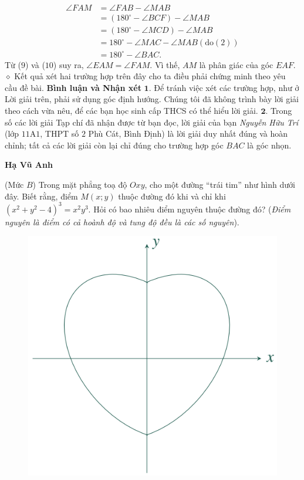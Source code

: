 \begin{multicols}{2}
\begin{align*}
		\angle FAM &= \angle FAB - \angle MAB\\
		&= \left( {{{180}^{\circ}} - \angle BCF} \right) - \angle MAB\\
		&= \left( {{{180}^{\circ}} - \angle MCD} \right) - \angle MAB\\
		&= {180^{\circ}} - \angle MAC - \angle MAB({\text{do}}(2))\\
		&= {180^{\circ}} - \angle BAC. \tag{$10$}
	\end{align*}
	Từ ($9$) và ($10$) suy ra, $\angle EAM = \angle FAM$.  Vì thế, $AM$ là phân giác của góc $EAF$.
	\vskip 0.05cm
	$\diamond$ Kết quả xét hai trường hợp trên đây cho ta điều phải chứng minh theo yêu cầu đề bài.
	\vskip 0.05cm
	\textbf{\color{thachthuctoanhoc}Bình luận và Nhận xét}
	\vskip 0.05cm
	$\pmb{1.}$ Để tránh việc xét các trường hợp, như ở Lời giải trên, phải sử dụng góc định hướng. Chúng tôi đã không trình bày lời giải theo cách vừa nêu, để các bạn học sinh cấp THCS có thể hiểu lời giải.
	\vskip 0.05cm
	$\pmb{2.}$ Trong số các lời giải Tạp chí đã nhận được từ bạn đọc, lời giải của bạn \textit{Nguyễn Hữu Trí} (lớp $11$A$1$, THPT số $2$ Phù Cát, Bình Định) là lời giải duy nhất đúng và hoàn chỉnh; tất cả các lời giải còn lại chỉ đúng cho trường hợp góc $BAC$ là góc nhọn.
	\begin{flushright}
		\textbf{\color{thachthuctoanhoc}Hạ Vũ Anh}
	\end{flushright}
	{}
	(Mức $B$) Trong mặt phẳng toạ độ $Oxy$, cho một đường ``trái tim'' như hình dưới đây. Biết rằng, điểm $M(x;y)$ thuộc đường đó khi và chỉ khi $\left(x^2\!+\!y^2\!-\!4\right)^{\!3}\!=\! x^2y^3$. Hỏi có bao nhiêu điểm nguyên thuộc đường đó?  
	\vskip 0.05cm
	({\it Điểm nguyên là điểm có cả hoành độ và tung độ đều là các số nguyên}).
	\begin{figure}[H]
		\centering
		\vspace*{-5pt}
		\captionsetup{labelformat= empty, justification=centering}
		\includegraphics[width=0.8\linewidth]{P1}

\end{figure}
\end{multicols}
